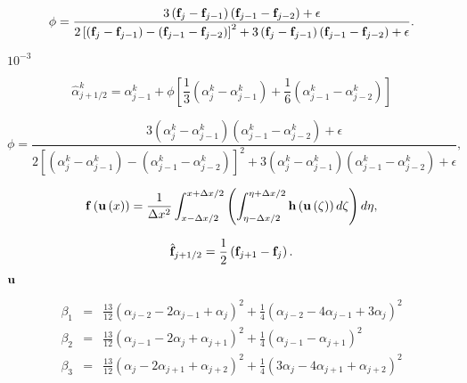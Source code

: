\documentclass{article}
\begin{document}
\begin{equation} \phi = \frac {3\left({\bf f}_j-{\bf f}_{j-1}\right)\left({\bf f}_{j-1}-{\bf f}_{j-2}\right) + \epsilon} {2\left[\left({\bf f}_j-{\bf f}_{j-1}\right)-\left({\bf f}_{j-1}-{\bf f}_{j-2}\right)\right]^2 + 3\left({\bf f}_j-{\bf f}_{j-1}\right)\left({\bf f}_{j-1}-{\bf f}_{j-2}\right) + \epsilon}. \end{equation}
\pagebreak

$10^{-3}$
\pagebreak

\begin{equation} \hat{\alpha}^k_{j+1/2} = {\alpha}^k_{j-1} + \phi \left[\frac{1}{3}\left({\alpha}^k_j-{\alpha}^k_{j-1}\right) + \frac{1}{6}\left({\alpha}^k_{j-1}-{\alpha}^k_{j-2}\right)\right] \end{equation}
\pagebreak

\begin{equation} \phi = \frac {3\left({\alpha}^k_j-{\alpha}^k_{j-1}\right)\left({\alpha}^k_{j-1}-{\alpha}^k_{j-2}\right) + \epsilon} {2\left[\left({\alpha}^k_j-{\alpha}^k_{j-1}\right)-\left({\alpha}^k_{j-1}-{\alpha}^k_{j-2}\right)\right]^2 + 3\left({\alpha}^k_j-{\alpha}^k_{j-1}\right)\left({\alpha}^k_{j-1}-{\alpha}^k_{j-2}\right) + \epsilon}, \end{equation}
\pagebreak

\begin{equation} {\bf f}\left({\bf u}\left(x\right)\right) = \frac{1}{\Delta x^2} \int_{x-\Delta x/2}^{x+\Delta x/2} \left( \int_{\eta-\Delta x/2}^{\eta+\Delta x/2} {\bf h}\left({\bf u}\left(\zeta\right)\right) d\zeta \right) d\eta, \end{equation}
\pagebreak

\begin{equation} \hat{\bf f}_{j+1/2} = \frac{1}{2}\left( {\bf f}_{j+1} - {\bf f}_j \right). \end{equation}
\pagebreak

$\bf u$
\pagebreak

\begin{eqnarray} \beta_1 &=& \frac{13}{12} \left(\alpha_{j-2}-2\alpha_{j-1}+\alpha_j\right)^2 + \frac{1}{4}\left(\alpha_{j-2}-4\alpha_{j-1}+3\alpha_j\right)^2 \\ \beta_2 &=& \frac{13}{12} \left(\alpha_{j-1}-2\alpha_j+\alpha_{j+1}\right)^2 + \frac{1}{4}\left(\alpha_{j-1}-\alpha_{j+1}\right)^2 \\ \beta_3 &=& \frac{13}{12} \left(\alpha_j-2\alpha_{j+1}+\alpha_{j+2}\right)^2 + \frac{1}{4}\left(3\alpha_j-4\alpha_{j+1}+\alpha_{j+2}\right)^2 \end{eqnarray}
\pagebreak
\end{document}
